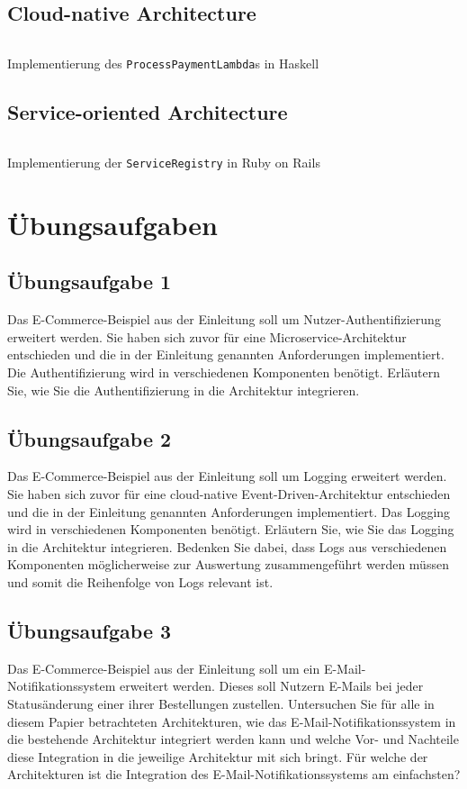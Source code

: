 \documentclass[acmtog]{acmart}
\begin{document}
\subsection{Cloud-native Architecture}
\label{app:code:cloudnative:paymentservice}
\begin{listing}[H]
  \tiny
  \inputminted[linenos=true]{haskell}{code/cloud/PaymentService.hs}
  \caption{Implementierung des \texttt{ProcessPaymentLambda}s in Haskell}
\end{listing}

\subsection{Service-oriented Architecture}
\label{app:code:soa:registry}
\begin{listing}[H]
  \tiny
  \inputminted[linenos=true]{ruby}{code/soa/service_registry.rb}
  \caption{Implementierung der \texttt{ServiceRegistry} in Ruby on Rails}
\end{listing}

\section{Übungsaufgaben}
\subsection{Übungsaufgabe 1}
Das E-Commerce-Beispiel aus der Einleitung soll um Nutzer-Authentifizierung erweitert werden.
Sie haben sich zuvor für eine Microservice-Architektur entschieden und die in der Einleitung genannten Anforderungen implementiert.
Die Authentifizierung wird in verschiedenen Komponenten benötigt.
Erläutern Sie, wie Sie die Authentifizierung in die Architektur integrieren.

\subsection{Übungsaufgabe 2}
Das E-Commerce-Beispiel aus der Einleitung soll um Logging erweitert werden.
Sie haben sich zuvor für eine cloud-native Event-Driven-Architektur entschieden und die in der Einleitung genannten Anforderungen implementiert.
Das Logging wird in verschiedenen Komponenten benötigt.
Erläutern Sie, wie Sie das Logging in die Architektur integrieren.
Bedenken Sie dabei, dass Logs aus verschiedenen Komponenten möglicherweise zur Auswertung zusammengeführt werden müssen und somit die Reihenfolge von Logs relevant ist.

\subsection{Übungsaufgabe 3}
Das E-Commerce-Beispiel aus der Einleitung soll um ein E-Mail-Notifikationssystem erweitert werden.
Dieses soll Nutzern E-Mails bei jeder Statusänderung einer ihrer Bestellungen zustellen.
Untersuchen Sie für alle in diesem Papier betrachteten Architekturen, wie das E-Mail-Notifikationssystem in die bestehende Architektur integriert werden kann
und welche Vor- und Nachteile diese Integration in die jeweilige Architektur mit sich bringt.
Für welche der Architekturen ist die Integration des E-Mail-Notifikationssystems am einfachsten?
\end{document}
